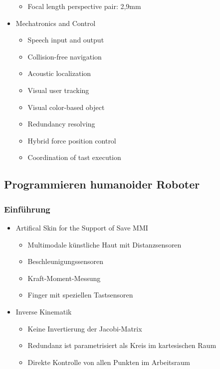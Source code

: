 \begin{itemize}
\begin{itemize}
		\item Focal length perspective pair: 2,9mm
	\end{itemize}
	\item Mechatronics and Control
	\begin{itemize}
		\item Speech input and output
		\item Collision-free navigation
		\item Acoustic localization
		\item Visual user tracking
		\item Visual color-based object
		\item Redundancy resolving
		\item Hybrid force position control
		\item Coordination of tast execution
	\end{itemize}
\end{itemize}

\subsection{Programmieren humanoider Roboter}

\subsubsection{Einführung}
\begin{itemize}
	\item Artifical Skin for the Support of Save MMI
	\begin{itemize}
		 \item Multimodale künstliche Haut mit Distanzsensoren
		 \item Beschleunigungssensoren
		 \item Kraft-Moment-Messung
		 \item Finger mit speziellen Tastsensoren
	\end{itemize}
	\item Inverse Kinematik
	\begin{itemize}
		\item Keine Invertierung der Jacobi-Matrix
		\item Redundanz ist parametrisiert als Kreis im kartesischen Raum
		\item Direkte Kontrolle von allen Punkten im Arbeitsraum
	\end{itemize}
\end{itemize}

